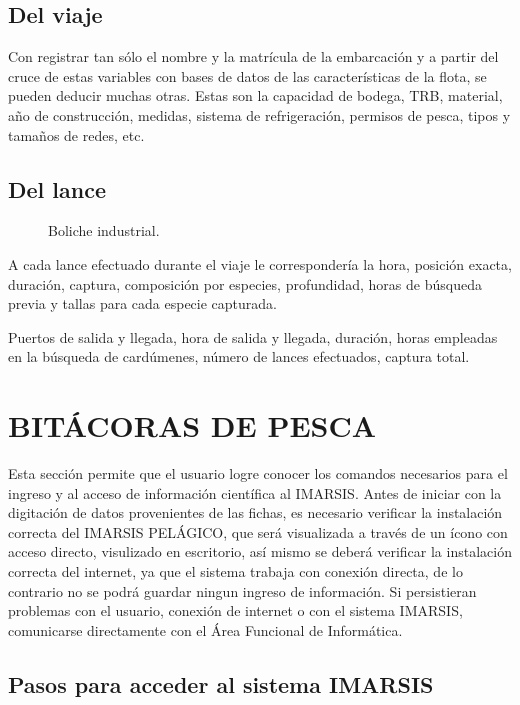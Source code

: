 \documentclass[a4paper,oneside,11pt]{book}
\begin{document}
\section{Del viaje} 
Con registrar tan sólo el nombre y la matrícula de la
embarcación y a partir del cruce de estas variables con bases de datos de las características de la flota, se pueden deducir muchas otras. Estas son la capacidad de bodega, TRB, material, año de construcción, medidas, sistema de refrigeración, permisos de pesca, tipos y tamaños de redes, etc.

\section{Del lance}
 \begin{figure}[!h]
  \begin{center} 
  \caption{Boliche industrial.}
 \end{center}
  \end{figure}

A cada lance efectuado durante el viaje le correspondería la hora, posición exacta, duración, captura, composición por especies, profundidad, horas de búsqueda previa y tallas para cada especie capturada.

Puertos de salida y llegada, hora de salida y llegada, duración,
horas empleadas en la búsqueda de cardúmenes, número de lances
efectuados, captura total.


\chapter{BITÁCORAS DE PESCA} 
Esta sección permite que el usuario logre conocer los comandos necesarios para el ingreso y al acceso de información científica al IMARSIS. Antes de iniciar con la digitación de datos provenientes de las fichas, es necesario verificar la instalación correcta del IMARSIS PELÁGICO, que será visualizada a través de un ícono con acceso directo, visulizado en escritorio, así mismo se deberá verificar la instalación correcta del internet, ya que el sistema trabaja con conexión directa, de lo contrario no se podrá guardar ningun ingreso de información.
Si persistieran problemas con el usuario, conexión de internet o  con el sistema IMARSIS, comunicarse directamente con el Área Funcional de Informática. 

\section {Pasos para acceder al sistema IMARSIS}
\end{document}
